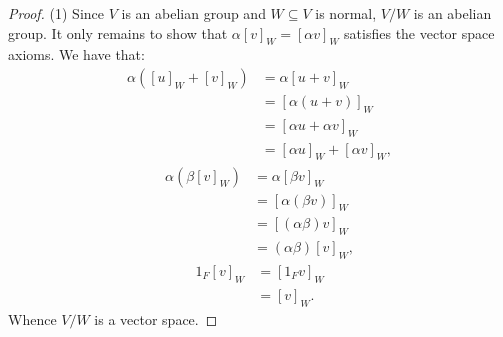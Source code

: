 \documentclass[11pt,twoside,openany]{memoir}
\begin{document}
        {\color{red} \begin{proof}
            (1) Since $V$ is an abelian group and $W \subseteq V$ is normal, $V/W$ is an abelian group. It only remains to show that $\alpha[v]_W = [\alpha v]_W$ satisfies the vector space axioms. We have that:
                \begin{equation*}
                \begin{split}
                    \alpha \left( [u]_W + [v]_W \right)
                    & = \alpha [u+v]_W \\
                    & = [\alpha (u+v)]_W \\
                    & = [\alpha u + \alpha v]_W \\
                    & = [\alpha u]_W + [\alpha  v]_W,
                \end{split}
                \end{equation*}
                \begin{equation*}
                \begin{split}
                    \alpha \left( \beta [v]_W \right)
                    & = \alpha [\beta v]_W \\
                    & = [\alpha (\beta v)]_W \\
                    & = [(\alpha \beta)v]_W \\
                    & = (\alpha \beta)[v]_W,
                \end{split}
                \end{equation*}
                \begin{equation*}
                \begin{split}
                    1_F [v]_W 
                    & = [1_F v]_W \\
                    & = [v]_W.
                \end{split}
                \end{equation*}
            Whence $V/W$ is a vector space.


\end{proof}}
\end{document}
